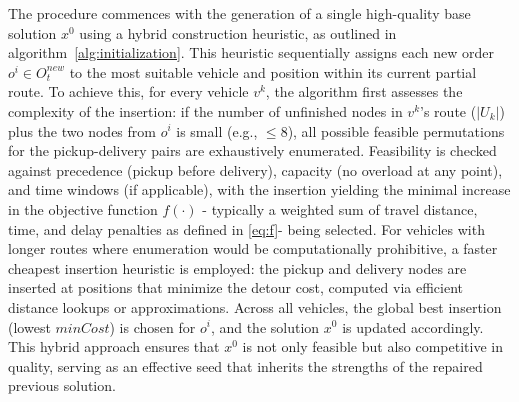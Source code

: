 \documentclass[preprint,12pt]{elsarticle}
\begin{document}
The procedure commences with the generation of a single high-quality base solution $x^0$ using a hybrid  construction heuristic, as outlined in algorithm~\ref{alg:initialization}. This heuristic sequentially assigns each new order $o^i \in O_t^{new}$ to the most suitable vehicle and position within its current partial route. To achieve this, for every vehicle $v^k$, the algorithm first assesses the complexity of the insertion: if the number of unfinished nodes in $v^k$'s route ($|U_k|$) plus the two nodes from $o^i$ is small (e.g., $\leq 8$), all possible feasible permutations for the pickup-delivery pairs are exhaustively enumerated. Feasibility is checked against precedence (pickup before delivery), capacity (no overload at any point), and time windows (if applicable), with the insertion yielding the minimal increase in the objective function $f(\cdot)$ - typically a weighted sum of travel distance, time, and delay penalties as defined in \autoref{eq:f}- being selected. For vehicles with longer routes where enumeration would be computationally prohibitive, a faster cheapest insertion heuristic is employed: the pickup and delivery nodes are inserted at positions that minimize the detour cost, computed via efficient distance lookups or approximations. Across all vehicles, the global best insertion (lowest $minCost$) is chosen for $o^i$, and the solution $x^0$ is updated accordingly. This hybrid approach ensures that $x^0$ is not only feasible but also competitive in quality, serving as an effective seed that inherits the strengths of the repaired previous solution.




\end{document}
